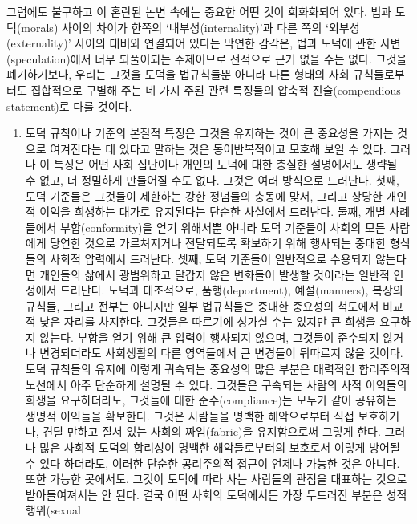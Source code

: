 그럼에도 불구하고 이 혼란된 논변 속에는 중요한 어떤 것이 희화화되어
있다. 법과 도덕(morals) 사이의 차이가 한쪽의 ‘내부성(internality)’과
다른 쪽의 ‘외부성(externality)’ 사이의 대비와 연결되어 있다는 막연한
감각은, 법과 도덕에 관한 사변(speculation)에서 너무 되풀이되는
주제이므로 전적으로 근거 없을 수는 없다. 그것을 폐기하기보다, 우리는
그것을 도덕을 법규칙들뿐 아니라 다른 형태의 사회 규칙들로부터도
집합적으로 구별해 주는 네 가지 주된 관련 특징들의 압축적
진술(compendious statement)로 다룰 것이다.

\begin{enumerate}
\def\labelenumi{(\roman{enumi})}
\tightlist
\item
    도덕 규칙이나 기준의 본질적
  특징은 그것을 유지하는 것이 큰 중요성을 가지는 것으로 여겨진다는 데
  있다고 말하는 것은 동어반복적이고 모호해 보일 수 있다. 그러나 이
  특징은 어떤 사회 집단이나 개인의 도덕에 대한 충실한 설명에서도 생략될
  수 없고, 더 정밀하게 만들어질 수도 없다. 그것은 여러 방식으로
  드러난다. 첫째, 도덕 기준들은 그것들이 제한하는 강한 정념들의 충동에
  맞서, 그리고 상당한 개인적 이익을 희생하는 대가로 유지된다는 단순한
  사실에서 드러난다. 둘째, 개별 사례들에서 부합(conformity)을 얻기
  위해서뿐 아니라 도덕 기준들이 사회의 모든 사람에게 당연한 것으로
  가르쳐지거나 전달되도록 확보하기 위해 행사되는 중대한 형식들의 사회적
  압력에서 드러난다. 셋째, 도덕 기준들이 일반적으로 수용되지 않는다면
  개인들의 삶에서 광범위하고 달갑지 않은 변화들이 발생할 것이라는 일반적
  인정에서 드러난다. 도덕과 대조적으로, 품행(deportment), 예절(manners),
  복장의 규칙들, 그리고 전부는 아니지만 일부 법규칙들은 중대한 중요성의
  척도에서 비교적 낮은 자리를 차지한다. 그것들은 따르기에 성가실 수는
  있지만 큰 희생을 요구하지 않는다. 부합을 얻기 위해 큰 압력이 행사되지
  않으며, 그것들이 준수되지 않거나 변경되더라도 사회생활의 다른
  영역들에서 큰 변경들이 뒤따르지 않을 것이다. 도덕 규칙들의 유지에
  이렇게 귀속되는 중요성의 많은 부분은 매력적인 합리주의적 노선에서 아주
  단순하게 설명될 수 있다. 그것들은 구속되는 사람의 사적 이익들의 희생을
  요구하더라도, 그것들에 대한 준수(compliance)는 모두가 같이 공유하는
  생명적 이익들을 확보한다. 그것은 사람들을 명백한 해악으로부터 직접
  보호하거나, 견딜 만하고 질서 있는 사회의 짜임(fabric)을 유지함으로써
  그렇게 한다. 그러나 많은 사회적 도덕의 합리성이 명백한 해악들로부터의
  보호로서 이렇게 방어될 수 있다 하더라도, 이러한 단순한 공리주의적
  접근이 언제나 가능한 것은 아니다. 또한 가능한 곳에서도, 그것이 도덕에
  따라 사는 사람들의 관점을 대표하는 것으로 받아들여져서는 안 된다. 결국
  어떤 사회의 도덕에서든 가장 두드러진 부분은 성적 행위(sexual

\end{enumerate}
